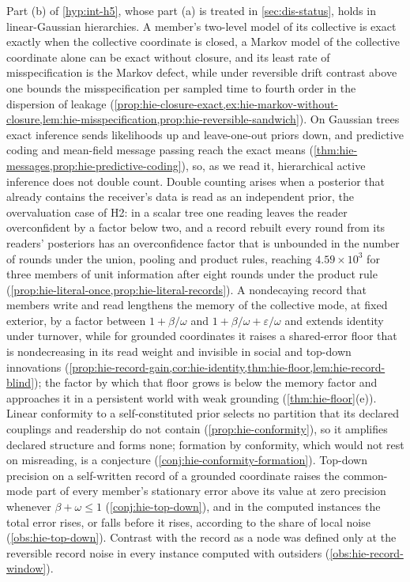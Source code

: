 Part (b) of \cref{hyp:int-h5}, whose part (a) is treated in \cref{sec:dis-status}, holds in linear-Gaussian hierarchies. A member's two-level model of its collective is exact exactly when the collective coordinate is closed, a Markov model of the collective coordinate alone can be exact without closure, and its least rate of misspecification is the Markov defect, while under reversible drift contrast above one bounds the misspecification per sampled time to fourth order in the dispersion of leakage (\cref{prop:hie-closure-exact,ex:hie-markov-without-closure,lem:hie-misspecification,prop:hie-reversible-sandwich}). On Gaussian trees exact inference sends likelihoods up and leave-one-out priors down, and predictive coding and mean-field message passing reach the exact means (\cref{thm:hie-messages,prop:hie-predictive-coding}), so, as we read it, hierarchical active inference does not double count. Double counting arises when a posterior that already contains the receiver's data is read as an independent prior, the overvaluation case of H2: in a scalar tree one reading leaves the reader overconfident by a factor below two, and a record rebuilt every round from its readers' posteriors has an overconfidence factor that is unbounded in the number of rounds under the union, pooling and product rules, reaching $4.59\times10^3$ for three members of unit information after eight rounds under the product rule (\cref{prop:hie-literal-once,prop:hie-literal-records}). A nondecaying record that members write and read lengthens the memory of the collective mode, at fixed exterior, by a factor between $1+\beta/\omega$ and $1+\beta/\omega+\varepsilon/\omega$ and extends identity under turnover, while for grounded coordinates it raises a shared-error floor that is nondecreasing in its read weight and invisible in social and top-down innovations (\cref{prop:hie-record-gain,cor:hie-identity,thm:hie-floor,lem:hie-record-blind}); the factor by which that floor grows is below the memory factor and approaches it in a persistent world with weak grounding (\cref{thm:hie-floor}(e)). Linear conformity to a self-constituted prior selects no partition that its declared couplings and readership do not contain (\cref{prop:hie-conformity}), so it amplifies declared structure and forms none; formation by conformity, which would not rest on misreading, is a conjecture (\cref{conj:hie-conformity-formation}). Top-down precision on a self-written record of a grounded coordinate raises the common-mode part of every member's stationary error above its value at zero precision whenever $\beta+\omega\le1$ (\cref{conj:hie-top-down}), and in the computed instances the total error rises, or falls before it rises, according to the share of local noise (\cref{obs:hie-top-down}). Contrast with the record as a node was defined only at the reversible record noise in every instance computed with outsiders (\cref{obs:hie-record-window}).

